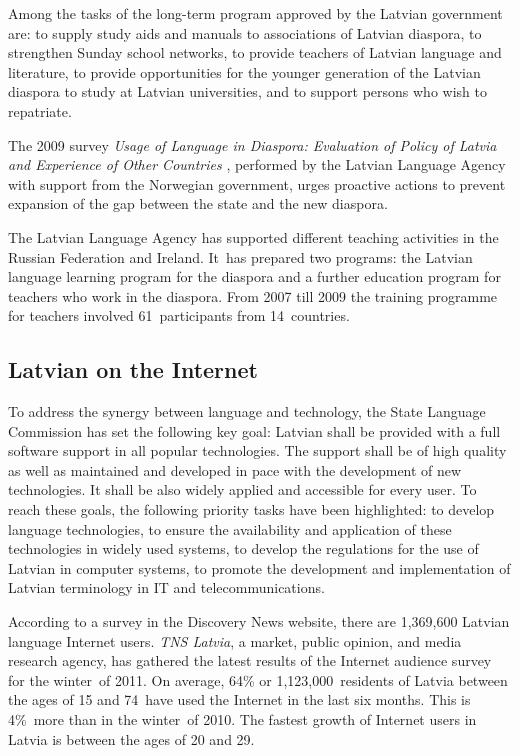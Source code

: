 \begin{multicols}{2}
Among the tasks of the long-term program approved by the Latvian government are: to supply study aids and manuals to associations of Latvian diaspora, to strengthen Sunday school networks, to provide teachers of Latvian language and literature, to provide opportunities for the younger generation of the Latvian diaspora to study at Latvian universities, and to support persons who wish to repatriate.

The 2009 survey \textit{Usage of Language in Diaspora: Evaluation of Policy of Latvia and Experience of Other Countries} \cite{Meta4}, performed by the Latvian Language Agency with support from the Norwegian government, urges proactive actions to prevent expansion of the gap between the state and the new diaspora.

The Latvian Language Agency has supported different teaching activities in the Russian Federation and Ireland.
It~has prepared two programs: the Latvian language learning program for the diaspora and a further education program for teachers who work in the diaspora.
From 2007 till 2009 the training programme for teachers involved 61~participants from 14~countries.

\subsection{Latvian on the Internet}

To address the synergy between language and technology, the State Language Commission has set the following key goal: Latvian shall be provided with a full software support in all popular technologies. The support shall be of high quality as well as maintained and developed in pace with the development of new technologies. It shall be also widely applied and accessible for every user. To reach these goals, the following priority tasks have been highlighted: to develop language technologies, to ensure the availability and application of these technologies in widely used systems, to develop the regulations for the use of Latvian in computer systems, to promote the development and implementation of Latvian terminology in IT and telecommunications.


According to a survey in the Discovery News website, there are 1,369,600 Latvian language Internet users.
\textit{TNS Latvia}, a market, public opinion, and media research agency, has gathered the latest results of the Internet audience survey for the winter~of 2011.
On average, 64\% or 1,123,000~residents of Latvia between the ages of 15 and 74~have used the Internet in the last six months.
This is 4\%~more than in the winter~of 2010.
The fastest growth of Internet users in Latvia is between the ages of 20 and 29.


\end{multicols}
